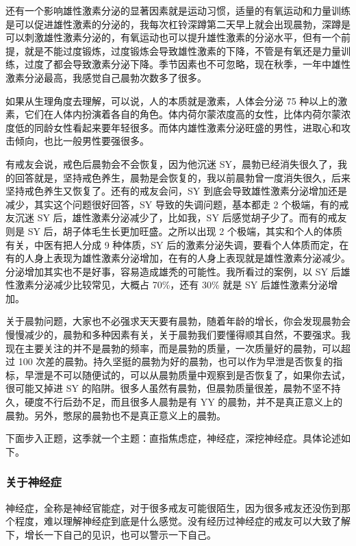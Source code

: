 \documentclass{ctexart}
\begin{document}
还有一个影响雄性激素分泌的显著因素就是运动习惯，适量的有氧运动和力量训练是可以促进雄性激素的分泌的，我每次杠铃深蹲第二天早上就会出现晨勃，深蹲是可以刺激雄性激素分泌的，有氧运动也可以提升雄性激素的分泌水平，但有一个前提，就是不能过度锻炼，过度锻炼会导致雄性激素的下降，不管是有氧还是力量训练，过度了都会导致激素分泌下降。季节因素也不可忽略，现在秋季，一年中雄性激素分泌最高，我感觉自己晨勃次数多了很多。

如果从生理角度去理解，可以说，人的本质就是激素，人体会分泌 75 种以上的激素，它们在人体内扮演着各自的角色。体内荷尔蒙浓度高的女性，比体内荷尔蒙浓度低的同龄女性看起来要年轻很多。而体内雄性激素分泌旺盛的男性，进取心和攻击倾向，也比一般男性要强很多。

有戒友会说，戒色后晨勃会不会恢复，因为他沉迷 SY，晨勃已经消失很久了，我的回答就是，坚持戒色养生，晨勃是会恢复的，我以前晨勃曾一度消失很久，后来坚持戒色养生又恢复了。还有的戒友会问，SY 到底会导致雄性激素分泌增加还是减少，其实这个问题很好回答，SY 导致的失调问题，基本都走 2 个极端，有的戒友沉迷 SY 后，雄性激素分泌减少了，比如我，SY 后感觉胡子少了。而有的戒友则是 SY 后，胡子体毛生长更加旺盛。之所以出现 2 个极端，其实和个人的体质有关，中医有把人分成 9 种体质，SY 后的激素分泌失调，要看个人体质而定，在有的人身上表现为雄性激素分泌增加，在有的人身上表现就是雄性激素分泌减少。分泌增加其实也不是好事，容易造成雄秃的可能性。我所看过的案例，以 SY 后雄性激素分泌减少比较常见，大概占 70\%，还有 30\% 就是 SY 后雄性激素分泌增加。

关于晨勃问题，大家也不必强求天天要有晨勃，随着年龄的增长，你会发现晨勃会慢慢减少的，晨勃和多种因素有关，关于晨勃我们要懂得顺其自然，不要强求。我现在主要关注的并不是晨勃的频率，而是晨勃的质量，一次质量好的晨勃，可以超过 100 次差的晨勃。持久坚挺的晨勃为好的晨勃，也可以作为早泄是否恢复的指标，早泄是不可以随便试的，可以从晨勃质量中观察到是否恢复了，如果你去试，很可能又掉进 SY 的陷阱。很多人虽然有晨勃，但晨勃质量很差，晨勃不坚不持久，硬度不行后劲不足，而且很多人晨勃是有 YY 的晨勃，并不是真正意义上的晨勃。另外，憋尿的晨勃也不是真正意义上的晨勃。

下面步入正题，这季就一个主题：直指焦虑症，神经症，深挖神经症。具体论述如下。

\subsubsection{关于神经症}

神经症，全称是神经官能症，对于很多戒友可能很陌生，因为很多戒友还没伤到那个程度，难以理解神经症到底是什么感觉。没有经历过神经症的戒友可以大致了解下，增长一下自己的见识，也可以警示一下自己。
\end{document}
